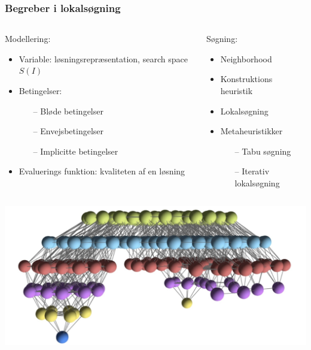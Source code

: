 \documentclass[smaller]{beamer}
\begin{document}
\begin{frame}
 \frametitle{Begreber i lokalsøgning}
  \begin{columns}[T]
   \begin{column}[T]{.5\textwidth}
   Modellering: 
   \pause
 \begin{itemize}[<+->]
 \item Variable: løsningsrepræsentation, search space $S(I)$
 \item Betingelser: 
 \begin{itemize}[<+->]
  \item[--] Bløde betingelser
  \item[--] Envejsbetingelser
  \item[--] Implicitte betingelser
 \end{itemize}
\item Evaluerings funktion: kvaliteten af en løsning
 \end{itemize}
  \end{column}
   \begin{column}[T]{.5\textwidth}
   Søgning:
   \pause
    \begin{itemize}[<+->]
     \item Neighborhood
      \item Konstruktions heuristik
     \item Lokalsøgning
     \item Metaheuristikker
      \begin{itemize}[<+->]
  \item[--] Tabu søgning
  \item[--] Iterativ lokalsøgning
 \end{itemize}
    \end{itemize}
   \end{column}
  \end{columns}
  \begin{center}
  \includegraphics[scale=0.2]{landscape1.jpg}
  \end{center} 
\end{frame}
\end{document}
